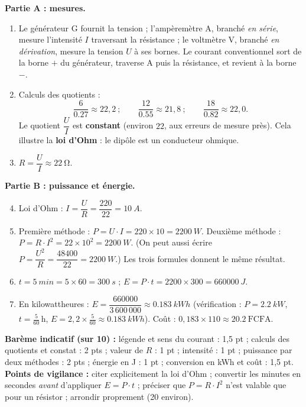 \documentclass[11pt]{article}
\begin{document}
\begin{corrige}
\textbf{Partie A : mesures.}
\begin{enumerate}
\item Le générateur G fournit la tension ; l'ampèremètre A, branché \emph{en série}, mesure l'intensité $I$ traversant la résistance ; le voltmètre V, branché \emph{en dérivation}, mesure la tension $U$ à ses bornes. Le courant conventionnel sort de la borne $+$ du générateur, traverse A puis la résistance, et revient à la borne $-$.
\item Calculs des quotients :
\[
\frac{6}{\num{0,27}} \approx 22,2 \ ; \qquad \frac{12}{\num{0,55}} \approx 21,8 \ ; \qquad \frac{18}{\num{0,82}} \approx 22,0.
\]
Le quotient $\dfrac{U}{I}$ est \textbf{constant} (environ $22$, aux erreurs de mesure près). Cela illustre la \textbf{loi d'Ohm} : le dipôle est un conducteur ohmique.
\item $R = \dfrac{U}{I} \approx \SI{22}{\ohm}$.
\end{enumerate}
\textbf{Partie B : puissance et énergie.}
\begin{enumerate}
\setcounter{enumi}{3}
\item Loi d'Ohm : $I = \dfrac{U}{R} = \dfrac{220}{22} = \SI{10}{A}$.
\item Première méthode : $P = U \cdot I = 220 \times 10 = \SI{2200}{W}$.
Deuxième méthode : $P = R \cdot I^2 = 22 \times 10^2 = \SI{2200}{W}$.
(On peut aussi écrire $P = \dfrac{U^2}{R} = \dfrac{48400}{22} = \SI{2200}{W}$.) Les trois formules donnent le même résultat.
\item $t = \SI{5}{min} = 5 \times 60 = \SI{300}{s}$ ; $E = P \cdot t = 2200 \times 300 = \SI{660000}{J}$.
\item En kilowattheures : $E = \dfrac{660000}{3\,600\,000} \approx \SI{0,183}{kWh}$ (vérification : $P = \SI{2,2}{kW}$, $t = \frac{5}{60}\,\text{h}$, $E = 2,2 \times \frac{5}{60} \approx \SI{0,183}{kWh}$).
Coût : $0,183 \times 110 \approx \SI{20,2}{\text{FCFA}}$.
\end{enumerate}
\textbf{Barème indicatif (sur 10) :} légende et sens du courant : 1,5 pt ; calculs des quotients et constat : 2 pts ; valeur de $R$ : 1 pt ; intensité : 1 pt ; puissance par deux méthodes : 2 pts ; énergie en J : 1 pt ; conversion en kWh et coût : 1,5 pt.
\textbf{Points de vigilance :} citer explicitement la loi d'Ohm ; convertir les minutes en secondes \emph{avant} d'appliquer $E = P \cdot t$ ; préciser que $P = R \cdot I^2$ n'est valable que pour un résistor ; arrondir proprement (\SI{20}{} environ).
\end{corrige}
\end{document}
